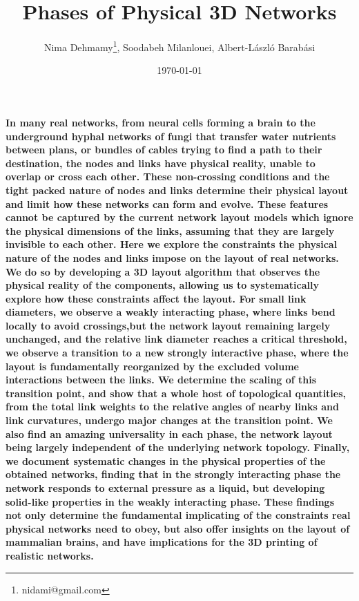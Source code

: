 \documentclass[nofootinbib,preprint,floatfix,endfloats]{revtex4} %
\begin{document}
\title{Phases of Physical 3D Networks}
\author{Nima Dehmamy\thanks{nidami@gmail.com}, Soodabeh Milanlouei, Albert-L\'aszl\'o Barab\'asi}
\date{\today}
\maketitle

{\bf 
In many real networks, from neural cells forming a brain to the underground hyphal networks of fungi that transfer water nutrients between plans, or bundles of cables trying to find a path to their destination, the nodes and links have physical reality, unable to overlap or cross each other. 
These non-crossing conditions and the tight packed nature of nodes and links determine their physical layout and limit how these networks can form and evolve. 
These features cannot be captured by the current network layout models which ignore the physical dimensions of the links, assuming that they are largely invisible to each other. 
Here we explore the constraints the physical nature of the nodes and links impose on the layout of real networks. 
We do so by developing a 3D layout algorithm that observes the physical reality of the components, allowing us to systematically explore how these constraints affect the layout. 
For small link diameters, we observe a weakly interacting phase, where links bend locally to avoid crossings,but the network layout remaining largely unchanged, and the relative link diameter reaches a critical threshold, we observe a transition to a new strongly interactive phase, where the layout is fundamentally reorganized by the excluded volume interactions between the links. 
We determine the scaling of this transition point, and show that a whole host of topological quantities, from the total link weights to the relative angles of nearby links and link curvatures, undergo major changes at the transition point. 
We also find an amazing universality in each phase, the network layout being largely independent of the underlying network topology. 
Finally, we document systematic changes in the physical properties of the obtained networks, finding that in the strongly interacting phase the network responds to external pressure as a liquid, but developing solid-like properties in the weakly interacting phase. 
These findings not only determine the fundamental implicating of the constraints real physical networks need to obey, but also offer insights on the layout of mammalian brains, and have implications for the 3D printing of realistic networks.
}
\end{document}
